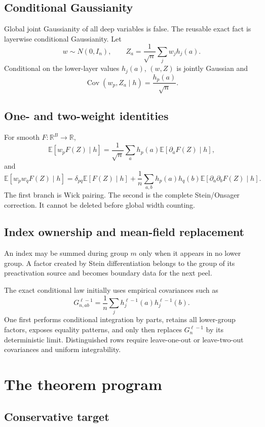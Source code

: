 \documentclass[11pt,oneside]{report}
\begin{document}
\section{Conditional Gaussianity}

Global joint Gaussianity of all deep variables is false.  The reusable exact
fact is layerwise conditional Gaussianity.  Let
\[
w\sim N(0,I_n),\qquad
Z_a=\frac1{\sqrt n}\sum_jw_jh_j(a).
\]
Conditional on the lower-layer values $h_j(a)$, $(w,Z)$ is jointly Gaussian
and
\[
\operatorname{Cov}(w_p,Z_a\mid h)
=\frac{h_p(a)}{\sqrt n}.
\]

\section{One- and two-weight identities}

For smooth $F:\mathbb R^B\to\mathbb R$,
\[
\mathbb E[w_pF(Z)\mid h]
=
\frac1{\sqrt n}\sum_a h_p(a)
\mathbb E[\partial_aF(Z)\mid h],
\]
and
\[
\mathbb E[w_pw_qF(Z)\mid h]
=
\delta_{pq}\mathbb E[F(Z)\mid h]
+
\frac1n\sum_{a,b}h_p(a)h_q(b)
\mathbb E[\partial_a\partial_bF(Z)\mid h].
\]
The first branch is Wick pairing.  The second is the complete Stein/Onsager
correction.  It cannot be deleted before global width counting.

\section{Index ownership and mean-field replacement}

An index may be summed during group $m$ only when it appears in no lower
group.  A factor created by Stein differentiation belongs to the group of its
preactivation source and becomes boundary data for the next peel.

The exact conditional law initially uses empirical covariances such as
\[
G_{n,ab}^{\ell-1}
=\frac1n\sum_jh_j^{\ell-1}(a)h_j^{\ell-1}(b).
\]
One first performs conditional integration by parts, retains all lower-group
factors, exposes equality patterns, and only then replaces $G_n^{\ell-1}$ by
its deterministic limit.  Distinguished rows require leave-one-out or
leave-two-out covariances and uniform integrability.

\chapter{The theorem program}

\section{Conservative target}
\end{document}
